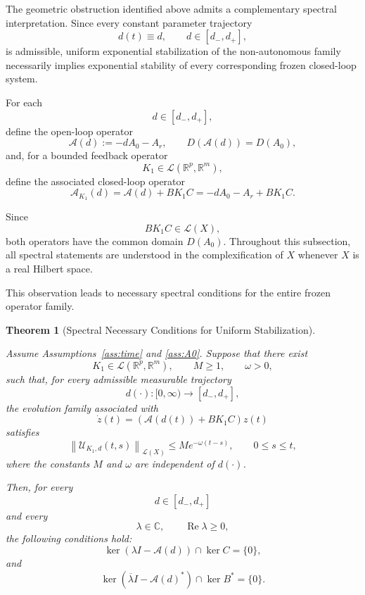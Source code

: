 \documentclass[pdflatex,sn-mathphys-num]{sn-jnl}
\theoremstyle{thmstyleone}%
\newtheorem{theorem}{Theorem}%
\theoremstyle{thmstyletwo}%
\theoremstyle{thmstylethree}%
\begin{document}
The geometric obstruction identified above admits a complementary spectral interpretation. Since every constant parameter trajectory
\[
d(t)\equiv d,
\qquad
d\in[d_-,d_+],
\]
is admissible, uniform exponential stabilization of the non-autonomous family necessarily implies exponential stability of every corresponding frozen closed-loop system.

For each
\[
d\in[d_-,d_+],
\]
define the open-loop operator
\begin{equation}
\mathcal A(d)
:=
-dA_0-A_r,
\qquad
D(\mathcal A(d))
=
D(A_0),
\label{eq:frozen-open-loop-operator}
\end{equation}
and, for a bounded feedback operator
\[
K_1\in\mathcal L(\mathbb R^p,\mathbb R^m),
\]
define the associated closed-loop operator
\begin{equation}
\mathcal A_{K_1}(d)
=
\mathcal A(d)+BK_1C
=
-dA_0-A_r+BK_1C.
\label{eq:frozen-closed-loop-operator}
\end{equation}

Since
\[
BK_1C\in\mathcal L(X),
\]
both operators have the common domain
\(
D(A_0).
\)
Throughout this subsection, all spectral statements are understood in the complexification of \(X\) whenever \(X\) is a real Hilbert space.

This observation leads to necessary spectral conditions for the entire frozen operator family.

\begin{theorem}[Spectral Necessary Conditions for Uniform Stabilization]
\label{thm:frozen-family-hautus}

Assume Assumptions~\ref{ass:time} and \ref{ass:A0}.
Suppose that there exist
\[
K_1\in\mathcal L(\mathbb R^p,\mathbb R^m),
\qquad
M\ge1,
\qquad
\omega>0,
\]
such that, for every admissible measurable trajectory
\[
d(\cdot):[0,\infty)\rightarrow[d_-,d_+],
\]
the evolution family associated with
\begin{equation}
\dot z(t)
=
\left(
\mathcal A(d(t))+BK_1C
\right)z(t)
\label{eq:nonautonomous-frozen-hautus}
\end{equation}
satisfies
\begin{equation}
\left\|
\mathcal U_{K_1,d}(t,s)
\right\|_{\mathcal L(X)}
\le
Me^{-\omega(t-s)},
\qquad
0\le s\le t,
\label{eq:uniform-stability-hautus}
\end{equation}
where the constants
\(M\)
and
\(\omega\)
are independent of
\(d(\cdot)\).

Then, for every
\[
d\in[d_-,d_+]
\]
and every
\[
\lambda\in\mathbb C,
\qquad
\operatorname{Re}\lambda\ge0,
\]
the following conditions hold:
\begin{equation}
\ker\left(
\lambda I-\mathcal A(d)
\right)
\cap
\ker C
=
\{0\},
\label{eq:frozen-output-hautus}
\end{equation}
and
\begin{equation}
\ker\left(
\overline{\lambda}I-\mathcal A(d)^*
\right)
\cap
\ker B^*
=
\{0\}.
\label{eq:frozen-input-hautus}
\end{equation}

\end{theorem}
\end{document}
